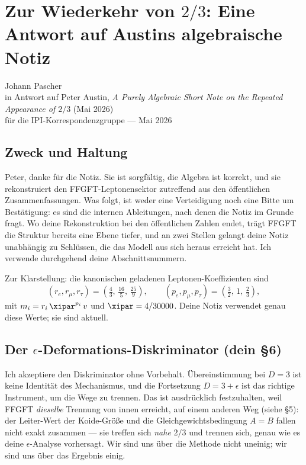 \chapter*{Zur Wiederkehr von \texorpdfstring{$2/3$}{2/3}: Eine Antwort auf Austins algebraische Notiz}

\begin{flushright}\small
Johann Pascher \\
in Antwort auf Peter Austin, \emph{A Purely Algebraic Short Note on the
Repeated Appearance of $2/3$} (Mai 2026) \\
für die IPI-Korrespondenzgruppe --- Mai 2026
\end{flushright}

\section{Zweck und Haltung}

Peter, danke für die Notiz. Sie ist sorgfältig, die Algebra ist korrekt,
und sie rekonstruiert den FFGFT-Leptonensektor zutreffend aus den
öffentlichen Zusammenfassungen. Was folgt, ist weder eine Verteidigung noch
eine Bitte um Bestätigung: es sind die internen Ableitungen, nach denen die
Notiz im Grunde fragt. Wo deine Rekonstruktion bei den öffentlichen Zahlen
endet, trägt FFGFT die Struktur bereits eine Ebene tiefer, und an zwei
Stellen gelangt deine Notiz unabhängig zu Schlüssen, die das Modell aus
sich heraus erreicht hat. Ich verwende durchgehend deine Abschnittsnummern.

Zur Klarstellung: die kanonischen geladenen Leptonen-Koeffizienten sind
\[
  (r_e, r_\mu, r_\tau) = \left(\tfrac{4}{3},\, \tfrac{16}{5},\, \tfrac{25}{9}\right),
  \qquad
  (p_e, p_\mu, p_\tau) = \left(\tfrac{3}{2},\, 1,\, \tfrac{2}{3}\right),
\]
mit $m_i = r_i\,\xipar^{p_i}\,v$ und $\xipar = 4/30000$. Deine Notiz
verwendet genau diese Werte; sie sind aktuell.

\section{Der $\epsilon$-Deformations-Diskriminator (dein \S6)}

Ich akzeptiere den Diskriminator ohne Vorbehalt. Übereinstimmung bei $D=3$
ist keine Identität des Mechanismus, und die Fortsetzung $D = 3+\epsilon$ ist
das richtige Instrument, um die Wege zu trennen. Das ist ausdrücklich
festzuhalten, weil FFGFT \emph{dieselbe} Trennung von innen erreicht, auf
einem anderen Weg (siehe \S5): der Leiter-Wert der Koide-Größe und die
Gleichgewichtsbedingung $A=B$ fallen nicht exakt zusammen --- sie treffen
sich \emph{nahe} $2/3$ und trennen sich, genau wie es deine
$\epsilon$-Analyse vorhersagt. Wir sind uns über die Methode nicht uneinig;
wir sind uns über das Ergebnis einig.

